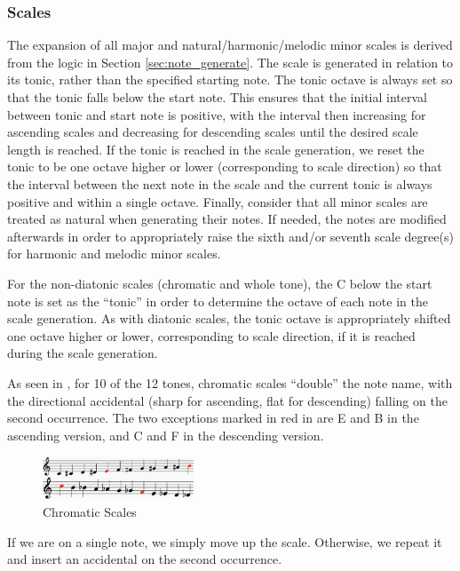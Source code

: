 \documentclass{article}
\begin{document}
\subsubsection{Scales}
The expansion of all major and natural/harmonic/melodic minor scales is derived from the logic in Section \ref{sec:note_generate}. The scale is generated in relation to its tonic, rather than the specified starting note. The tonic octave is always set so that the tonic falls below the start note. This ensures that the initial interval between tonic and start note is positive, with the interval then increasing for ascending scales and decreasing for descending scales until the desired scale length is reached. If the tonic is reached in the scale generation, we reset the tonic to be one octave higher or lower (corresponding to scale direction) so that the interval between the next note in the scale and the current tonic is always positive and within a single octave. Finally, consider that all minor scales are treated as natural when generating their notes. If needed, the notes are modified afterwards in order to appropriately raise the sixth and/or seventh scale degree(s) for harmonic and melodic minor scales. 

For the non-diatonic scales (chromatic and whole tone), the C below the start note is set as the “tonic” in order to determine the octave of each note in the scale generation. As with diatonic scales, the tonic octave is appropriately shifted one octave higher or lower, corresponding to scale direction, if it is reached during the scale generation.

As seen in , for 10 of the 12 tones, chromatic scales “double” the note name, with the directional accidental (sharp for ascending, flat for descending) falling on the second occurrence. The two exceptions marked in red in  are E and B in the ascending version, and C and F in the descending version.

\begin{figure}[h!]
\centering
\includegraphics[width=0.4\textwidth]{images/chromatic}
\caption{Chromatic Scales}
\label{chromatic}
\vspace{-3mm}
\end{figure}

If we are on a single note, we simply move up the scale. Otherwise, we repeat it and insert an accidental on the second occurrence.
\end{document}
